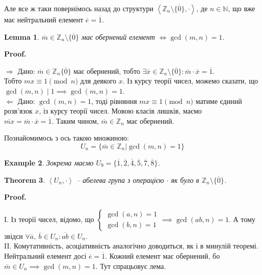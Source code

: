 \documentclass[a4paper, 10pt]{article}
\makeatletter
\def\rightproof{$\boxed{\Rightarrow}$ }
\def\leftproof{$\boxed{\Leftarrow}$ }
\theoremstyle{theoremdd}
\newtheorem{theorem}{Theorem}[subsection]
\theoremstyle{theoremdd}
\theoremstyle{theoremdd}
\theoremstyle{theoremdd}
\theoremstyle{theoremdd}
\newtheorem{example}[theorem]{Example}
\theoremstyle{theoremdd}
\theoremstyle{theoremdd}
\theoremstyle{theoremdd}
\theoremstyle{theoremdd}
\theoremstyle{theoremdd}
\theoremstyle{theoremdd}
\theoremstyle{theoremdd}
\theoremstyle{theoremdd}
\newtheorem{lemma}[theorem]{Lemma}
\theoremstyle{theoremdd}
\theoremstyle{theoremdd}
\renewenvironment{proof}[1][Proof.\\]{\par
\pushQED{\hfill \qed}%
\normalfont \topsep6\p@\@plus6\p@\relax
\trivlist
\item\relax
{\bfseries
#1\@addpunct{.}}\hspace\labelsep\ignorespaces
}{%
\popQED\endtrivlist\@endpefalse
}
\makeatother
\begin{document}
Але все ж таки повернімось назад до структури $\left< \mathbb{Z}_n \setminus \{\overline{0}\}, \cdot \right>$, де $n \in \mathbb{N}$, що вже має нейтральний елемент $\overline{e} = \overline{1}$.

\begin{lemma}
$\overline{m} \in \mathbb{Z}_n \setminus \{ \overline{0} \}$ має обернений елемент $\iff \gcd(m,n) = 1$.
\end{lemma}

\begin{proof}
\rightproof Дано: $\overline{m} \in \mathbb{Z}_n \{\overline{0}\}$ має обернений, тобто $\exists \overline{x} \in \mathbb{Z}_n \setminus \{\overline{0}\}: \overline{m} \cdot \overline{x} = \overline{1}$.\\
Тобто $mx \equiv 1 \pmod n$ для деякого $x$. Із курсу теорії чисел, можемо сказати, що $\gcd(m,n) \mid 1 \implies \gcd(m,n) = 1$.
\bigskip \\
\leftproof Дано: $\gcd(m,n) = 1$, тоді рівняння $mx \equiv 1 \pmod n$ матиме єдиний розв'язок $x$, із курсу теорії чисел. Мовою класів лишків, маємо \\ $\overline{mx} = \overline{m} \cdot \overline{x} = \overline{1}$. Таким чином, $\overline{m} \in \mathbb{Z}_n$ має обернений.
\end{proof}

Познайомимось з ось такою множиною:
$$ U_n = \{ \overline{m} \in \mathbb{Z}_n | \gcd(m,n) = 1 \}$$

\begin{example}
Зокрема маємо $U_9 = \{\overline{1},\overline{2},\overline{4},\overline{5},\overline{7},\overline{8} \}$.
\end{example}

\begin{theorem}
$\left<U_n, \cdot \right>$ -- абелева група з операцією $\cdot$ як було в $\mathbb{Z}_n \setminus \{ \overline{0} \}$.
\end{theorem}

\begin{proof}
I. Із теорії чисел, відомо, що $\begin{cases} \gcd(a,n) = 1 \\ \gcd(b,n) = 1 \end{cases} \implies \gcd(ab,n) = 1$. А тому звідси $\forall \overline{a},\ \overline{b} \in U_n: \overline{ab} \in U_n$.\\
II. Комутативність, асоціативність аналогічно доводиться, як і в минулій теоремі. Нейтральний елемент досі $\overline{e} = \overline{1}$. Кожний елемент має обернений, бо $\overline{m} \in U_n \implies \gcd(m,n) = 1$. Тут спрацьовує лема.
\end{proof}
\end{document}
